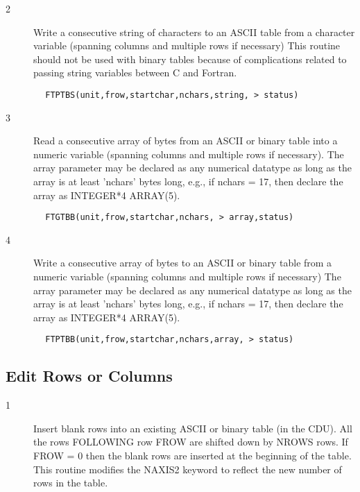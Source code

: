 \documentclass[11pt]{book}
\begin{document}
\begin{description}
\item[2 ] Write a consecutive string of characters to an ASCII table
    from a character variable (spanning columns and multiple rows if necessary)
    This routine should not be used with binary tables because of
   complications related to passing string variables between C and Fortran.
\end{description}

\begin{verbatim}
        FTPTBS(unit,frow,startchar,nchars,string, > status)
\end{verbatim}

\begin{description}
\item[3 ] Read a consecutive array of bytes from an ASCII or binary table
    into a numeric variable (spanning columns and multiple rows if necessary).
    The array parameter may be declared as any numerical datatype as long
    as the array is at least 'nchars' bytes long, e.g., if nchars = 17,
   then declare the array as INTEGER*4 ARRAY(5).
\end{description}

\begin{verbatim}
        FTGTBB(unit,frow,startchar,nchars, > array,status)
\end{verbatim}

\begin{description}
\item[4 ] Write a consecutive array of bytes to an ASCII or binary table
    from a numeric variable (spanning columns and multiple rows if necessary)
    The array parameter may be declared as any numerical datatype as long
    as the array is at least 'nchars' bytes long, e.g., if nchars = 17,
   then declare the array as INTEGER*4 ARRAY(5).
\end{description}

\begin{verbatim}
        FTPTBB(unit,frow,startchar,nchars,array, > status)
\end{verbatim}


\subsection{Edit Rows or Columns \label{FTIROW}}


\begin{description}
\item[1 ] Insert blank rows into an existing ASCII or binary table (in the CDU).
    All the rows FOLLOWING row FROW are shifted down by NROWS rows.  If
    FROW = 0 then the blank rows are inserted at the beginning of the
    table.  This routine modifies the NAXIS2 keyword to reflect the new
   number of rows in the table.
\end{description}
\end{document}
